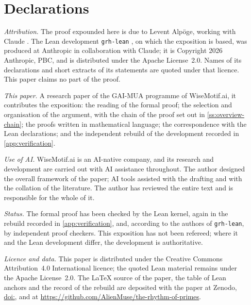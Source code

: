 \section*{Declarations}

\emph{Attribution.} The proof expounded here is due to Levent Alp\"oge, working with Claude
\cite{Alpoge2026}. The Lean development \texttt{grh-lean} \cite{GRHLean2026}, on which the exposition
is based, was produced at Anthropic in collaboration with Claude; it is Copyright 2026 Anthropic, PBC,
and is distributed under the Apache License~2.0. Names of its declarations and short extracts of its
statements are quoted under that licence. This paper claims no part of the proof.

\emph{This paper.} A research paper of the GAI-MUA programme of \mbox{WiseMotif.ai}, it contributes
the exposition: the reading of the formal proof; the selection and organisation of the argument,
with the chain of the proof set out in \cref{ss:overview-chain}; the proofs written in mathematical
language; the correspondence with the Lean declarations; and the independent rebuild of the
development recorded in \cref{app:verification}.

\emph{Use of AI.} \mbox{WiseMotif.ai} is an AI-native company, and its research and development are carried
out with AI assistance throughout. The author designed the overall framework of the paper; AI tools
assisted with the drafting and with the collation of the literature. The author has reviewed the
entire text and is responsible for the whole of it.

\emph{Status.} The formal proof has been checked by the Lean kernel, again in the rebuild recorded in
\cref{app:verification}, and, according to the authors of \texttt{grh-lean}, by independent proof
checkers. This exposition has not been refereed; where it and the Lean development differ, the
development is authoritative.

\emph{Licence and data.} This paper is distributed under the Creative Commons Attribution~4.0
International licence; the quoted Lean material remains under the Apache License~2.0. The \LaTeX{}
source of the paper, the table of Lean anchors and the record of the rebuild are deposited with the
paper at Zenodo, \href{https://doi.org/\RPdoi}{doi:\RPdoi}, and at
\url{https://github.com/AlienMuse/the-rhythm-of-primes}.
